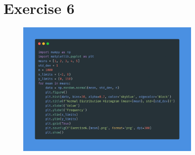 \documentclass[a4paper,12pt]{article}
\begin{document}
\section{Exercise 6}
\begin{figure}[h!]
    \centering
    \includegraphics[width=0.8\textwidth]{./Screenshots/Exercise6.py.png} 
\end{figure} \\
\end{document}
